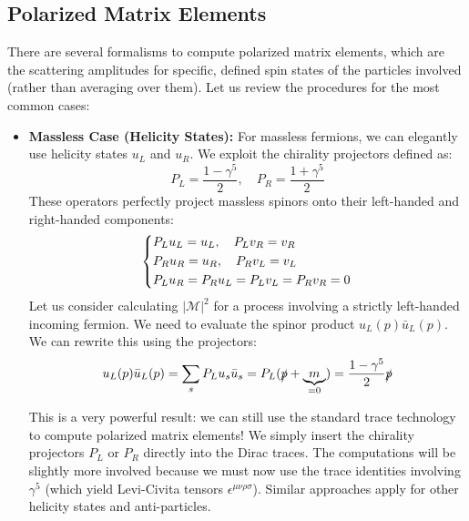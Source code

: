 \subsection{Polarized Matrix Elements}

There are several formalisms to compute polarized matrix elements, which are the scattering amplitudes for specific, defined spin states of the particles involved (rather than averaging over them). Let us review the procedures for the most common cases:

\begin{itemize}
    \item \textbf{Massless Case (Helicity States):}
          For massless fermions, we can elegantly use helicity states $u_L$ and $u_R$. We exploit the chirality projectors defined as:
          \[
              P_L = \frac{1 - \gamma^5}{2}, \quad P_R = \frac{1 + \gamma^5}{2}
          \]
          These operators perfectly project massless spinors onto their left-handed and right-handed components:
          \[
              \begin{dcases}
                  P_L u_L = u_L, \quad P_L v_R = v_R \\
                  P_R u_R = u_R, \quad P_R v_L = v_L \\
                  P_L u_R = P_R u_L = P_L v_L = P_R v_R = 0
              \end{dcases}
          \]
          Let us consider calculating $|\mathcal{M}|^2$ for a process involving a strictly left-handed incoming fermion. We need to evaluate the spinor product $u_L(p) \bar{u}_L(p)$. We can rewrite this using the projectors:
          \[
              u_L(p) \bar{u}_L(p) = \sum_{s} P_L u_s \bar{u}_s = P_L (\slashed{p} + \underbrace{m}_{=0}) = \frac{1 - \gamma^5}{2} \slashed{p}
          \]
          \begin{remark}
              This is a very powerful result: we can still use the standard trace technology to compute polarized matrix elements! We simply insert the chirality projectors $P_L$ or $P_R$ directly into the Dirac traces. The computations will be slightly more involved because we must now use the trace identities involving $\gamma^5$ (which yield Levi-Civita tensors $\epsilon^{\mu\nu\rho\sigma}$). Similar approaches apply for other helicity states and anti-particles.
          \end{remark}


\end{itemize}
